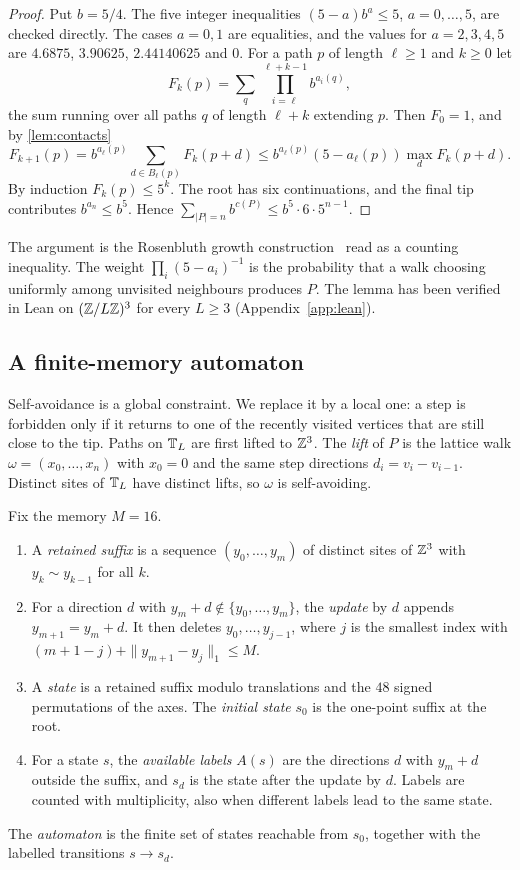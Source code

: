 \begin{proof}
Put $b=5/4$. The five integer inequalities $(5-a)b^a\le5$, $a=0,\dots,5$, are checked directly. The cases $a=0,1$ are equalities, and the values for $a=2,3,4,5$ are $4.6875$, $3.90625$, $2.44140625$ and $0$. For a path $p$ of length $\ell\ge1$ and $k\ge0$ let
\[
 F_k(p)=\sum_{q}\ \prod_{i=\ell}^{\ell+k-1}b^{a_i(q)},
\]
the sum running over all paths $q$ of length $\ell+k$ extending $p$. Then $F_0=1$, and by \cref{lem:contacts}
\[
 F_{k+1}(p)=b^{a_\ell(p)}\sum_{d\in B_\ell(p)}F_k(p+d)\le b^{a_\ell(p)}(5-a_\ell(p))\max_dF_k(p+d).
\]
By induction $F_k(p)\le5^k$. The root has six continuations, and the final tip contributes $b^{a_n}\le b^5$. Hence $\sum_{|P|=n}b^{c(P)}\le b^5\cdot6\cdot5^{n-1}$.
\end{proof}

The argument is the Rosenbluth growth construction~\cite{RR55} read as a counting inequality. The weight $\prod_i(5-a_i)^{-1}$ is the probability that a walk choosing uniformly among unvisited neighbours produces $P$. The lemma has been verified in Lean on $(\mathbb Z/L\mathbb Z)^3$ for every $L\ge3$ (Appendix~\ref{app:lean}).

\subsection{A finite-memory automaton}

Self-avoidance is a global constraint. We replace it by a local one: a step is forbidden only if it returns to one of the recently visited vertices that are still close to the tip. Paths on $\mathbb T_L$ are first lifted to $\mathbb Z^3$. The \emph{lift} of $P$ is the lattice walk $\omega=(x_0,\dots,x_n)$ with $x_0=0$ and the same step directions $d_i=v_i-v_{i-1}$. Distinct sites of $\mathbb T_L$ have distinct lifts, so $\omega$ is self-avoiding.

\begin{definition}\label{def:automaton}
Fix the memory $M=16$.
\begin{enumerate}
\item A \emph{retained suffix} is a sequence $(y_0,\dots,y_m)$ of distinct sites of $\mathbb Z^3$ with $y_k\sim y_{k-1}$ for all $k$.
\item For a direction $d$ with $y_m+d\notin\{y_0,\dots,y_m\}$, the \emph{update} by $d$ appends $y_{m+1}=y_m+d$. It then deletes $y_0,\dots,y_{j-1}$, where $j$ is the smallest index with $(m+1-j)+\|y_{m+1}-y_j\|_1\le M$.
\item A \emph{state} is a retained suffix modulo translations and the $48$ signed permutations of the axes. The \emph{initial state} $s_0$ is the one-point suffix at the root.
\item For a state $s$, the \emph{available labels} $A(s)$ are the directions $d$ with $y_m+d$ outside the suffix, and $s_d$ is the state after the update by $d$. Labels are counted with multiplicity, also when different labels lead to the same state.
\end{enumerate}
The \emph{automaton} is the finite set of states reachable from $s_0$, together with the labelled transitions $s\to s_d$.
\end{definition}

